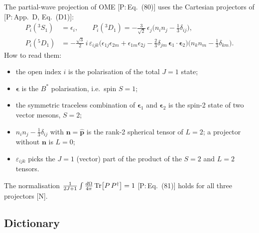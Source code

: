 \documentclass[11pt,a4paper]{article}
\newcommand{\tagP}[1]{\textcolor{blue!65!black}{\textsf{\small[P:\,#1]}}}
\newcommand{\tagN}{\textcolor{red!70!black}{\textsf{\small[N]}}}
\begin{document}
The partial-wave projection of OME \tagP{Eq.~(80)} uses the Cartesian projectors of \tagP{App.~D, Eq.~(D1)}:
\begin{align}
P_i(^3S_1)&=\epsilon_i,\qquad
P_i(^3D_1)=-\tfrac{3}{\sqrt2}\,\epsilon_j\big(n_in_j-\tfrac13\delta_{ij}\big),\nonumber\\
P_i(^5D_1)&=-\tfrac{\sqrt3}{2}\,i\,\varepsilon_{ijk}\Big(\epsilon_{1j}\epsilon_{2m}+\epsilon_{1m}\epsilon_{2j}-\tfrac23\delta_{jm}\,\bm\epsilon_1\cdot\bm\epsilon_2\Big)\big(n_kn_m-\tfrac13\delta_{km}\big).
\end{align}
How to read them:
\begin{itemize}
\item the open index $i$ is the polarisation of the total $J=1$ state;
\item $\bm\epsilon$ is the $B^*$ polarisation, i.e.\ spin $S=1$;
\item the symmetric traceless combination of $\bm\epsilon_1$ and $\bm\epsilon_2$ is the spin-2 state of two vector mesons, $S=2$;
\item $n_in_j-\frac13\delta_{ij}$ with $\bm n=\hat{\bm p}$ is the rank-2 spherical tensor of $L=2$; a projector without $\bm n$ is $L=0$;
\item $\varepsilon_{ijk}$ picks the $J=1$ (vector) part of the product of the $S=2$ and $L=2$ tensors.
\end{itemize}
The normalisation $\frac{1}{2J+1}\int\frac{d\Omega}{4\pi}\,{\rm Tr}\big[P\,P^\dagger\big]=1$ \tagP{Eq.~(81)} holds for all three projectors \tagN.

\subsection{Dictionary}
\label{sec:qn-dictionary}
\end{document}

